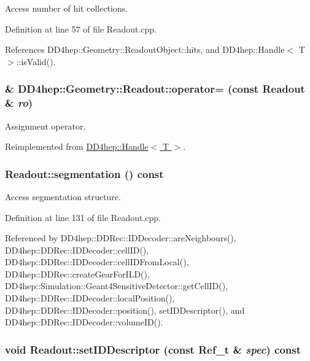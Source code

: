 Access number of hit collections. 

Definition at line 57 of file Readout.cpp.

References DD4hep::Geometry::ReadoutObject::hits, and DD4hep::Handle$<$ T $>$::isValid().\hypertarget{class_d_d4hep_1_1_geometry_1_1_readout_aeb7539a6b7ffb865b31eba7d9ee131ca}{
\subsubsection[{operator=}]{\& DD4hep::Geometry::Readout::operator= (const {\bf Readout} \& {\em ro})}}
\label{class_d_d4hep_1_1_geometry_1_1_readout_aeb7539a6b7ffb865b31eba7d9ee131ca}


Assignment operator. 

Reimplemented from \hyperlink{class_d_d4hep_1_1_handle_a9bbf8f498df42e81ad26fb00233505a6}{DD4hep::Handle$<$ T $>$}.\hypertarget{class_d_d4hep_1_1_geometry_1_1_readout_adad600720144e8431771098ad2dc4478}{
\subsubsection[{segmentation}]{ Readout::segmentation () const}}
\label{class_d_d4hep_1_1_geometry_1_1_readout_adad600720144e8431771098ad2dc4478}


Access segmentation structure. 

Definition at line 131 of file Readout.cpp.

Referenced by DD4hep::DDRec::IDDecoder::areNeighbours(), DD4hep::DDRec::IDDecoder::cellID(), DD4hep::DDRec::IDDecoder::cellIDFromLocal(), DD4hep::DDRec::createGearForILD(), DD4hep::Simulation::Geant4SensitiveDetector::getCellID(), DD4hep::DDRec::IDDecoder::localPosition(), DD4hep::DDRec::IDDecoder::position(), setIDDescriptor(), and DD4hep::DDRec::IDDecoder::volumeID().\hypertarget{class_d_d4hep_1_1_geometry_1_1_readout_a8317f078c7f2601d5d4f6dfe667730d4}{
\subsubsection[{setIDDescriptor}]{\setlength{\rightskip}{0pt plus 5cm}void Readout::setIDDescriptor (const {\bf Ref\_\-t} \& {\em spec}) const}}
\label{class_d_d4hep_1_1_geometry_1_1_readout_a8317f078c7f2601d5d4f6dfe667730d4}


